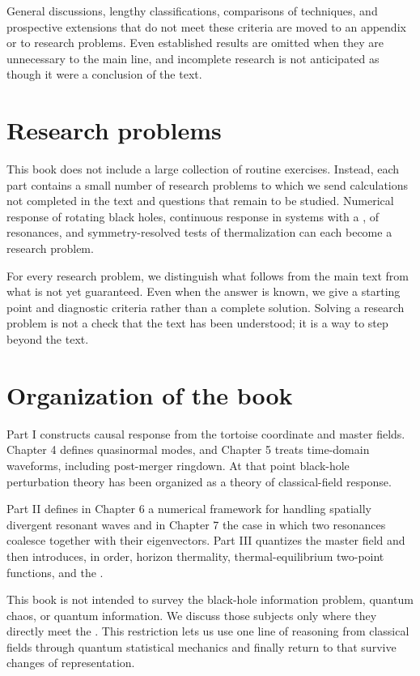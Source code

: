 General discussions, lengthy classifications, comparisons of techniques, and prospective extensions that do not meet these criteria are moved to an appendix or to research problems. Even established results are omitted when they are unnecessary to the main line, and incomplete research is not anticipated as though it were a conclusion of the text.

\section*{Research problems}

This book does not include a large collection of routine exercises. Instead, each part contains a small number of research problems to which we send calculations not completed in the text and questions that remain to be studied. Numerical response of rotating black holes, continuous response in systems with a ,  of resonances, and symmetry-resolved tests of thermalization can each become a research problem.

For every research problem, we distinguish what follows from the main text from what is not yet guaranteed. Even when the answer is known, we give a starting point and diagnostic criteria rather than a complete solution. Solving a research problem is not a check that the text has been understood; it is a way to step beyond the text.

\section*{Organization of the book}

Part I constructs causal response from the tortoise coordinate and master fields. Chapter 4 defines quasinormal modes, and Chapter 5 treats time-domain waveforms, including post-merger ringdown. At that point black-hole perturbation theory has been organized as a theory of classical-field response.

Part II defines in Chapter 6 a numerical framework for handling spatially divergent resonant waves and in Chapter 7 the case in which two resonances coalesce together with their eigenvectors. Part III quantizes the master field and then introduces, in order, horizon thermality, thermal-equilibrium two-point functions, and the .

This book is not intended to survey the black-hole information problem, quantum chaos, or quantum information. We discuss those subjects only where they directly meet the . This restriction lets us use one line of reasoning from classical fields through quantum statistical mechanics and finally return to  that survive changes of representation.

